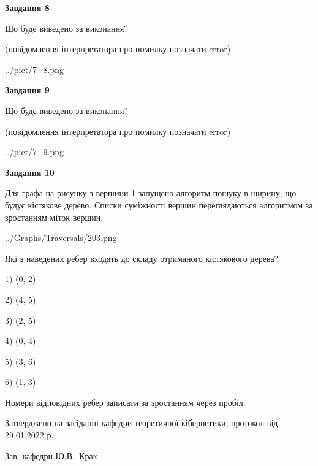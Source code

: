 \documentclass[12pt, ukrainian]{article}
\begin{document}
{\begin {large}
{\begin {center}\textbf{Завдання 8}\end {center}}\par
Що буде виведено за виконання?\par
 (повідомлення інтерпретатора про помилку позначати error)
\begin{center}
	{../pict/7_8.png}
\end{center}
\newpage

{\begin {center}\textbf{Завдання 9}\end {center}}\par
Що буде виведено за виконання?\par
 (повідомлення інтерпретатора про помилку позначати error)\par
\begin{center}
	{../pict/7_9.png}
\end{center}
\newpage

{\begin {center}\textbf{Завдання 10}\end {center}}\par
Для графа на рисунку з вершини 1 запущено алгоритм пошуку в ширину, що будує кістякове дерево. Списки суміжності вершин переглядаються алгоритмом за зростанням міток вершин.\par
\begin{center}
	{../Graphs/Traversals/203.png}
\end{center}
\par Які з наведених ребер входять до складу отриманого кістякового дерева?\par
1) (0, 2)\par
2) (4, 5)\par
3) (2, 5)\par
4) (0, 4)\par
5) (3, 6)\par
6) (1, 3)\par
{\vskip 15pt} Номери відповідних ребер записати за зростанням через пробіл.\par
\newpage


\end {large}
}
{\smallskip \begin {small} Затверджено на засіданні кафедри теоретичної кібернетики, протокол  від   29.01.2022 р.\par\smallskip\smallskip
{\parbox {6.5 cm}{Зав. кафедри \dotfill Ю.В.~Крак}} \end{small}}
\end{document}
